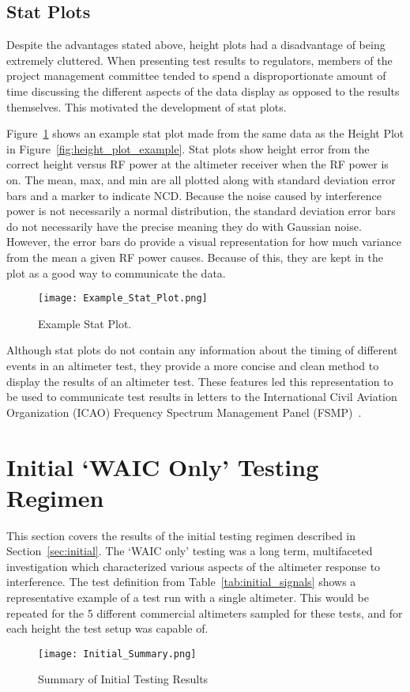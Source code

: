 \subsection{Stat Plots}
Despite the advantages stated above, height plots had a disadvantage of being extremely cluttered. When presenting test results to regulators, members of the project management committee tended to spend a disproportionate amount of time discussing the different aspects of the data display as opposed to the results themselves. This motivated the development of stat plots.

Figure~\ref{fig:stat_plot_example} shows an example stat plot made from the same data as the Height Plot in Figure~\ref{fig:height_plot_example}. Stat plots show height error from the correct height versus RF power at the altimeter receiver when the RF power is on. The mean, max, and min are all plotted along with standard deviation error bars and a marker to indicate NCD. Because the noise caused by interference power is not necessarily a normal distribution, the standard deviation error bars do not necessarily have the precise meaning they do with Gaussian noise. However, the error bars do provide a visual representation for how much variance from the mean a given RF power causes. Because of this, they are kept in the plot as a good way to communicate the data.  
\begin{figure}[h!]
	\centering
	\texttt{[image: Example\_Stat\_Plot.png]}
	\caption{Example Stat Plot.}
	\label{fig:stat_plot_example}
\end{figure}

 Although stat plots do not contain any information about the timing of different events in an altimeter test, they provide a more concise and clean method to display the results of an altimeter test. These features led this representation to be used to communicate test results in letters to the International Civil Aviation Organization (ICAO) Frequency Spectrum Management Panel (FSMP)~\cite{uwe_radio_2019}. 
 
 
\section{Initial `WAIC Only' Testing Regimen}\label{sec:initial_results}

This section covers the results of the initial testing regimen described in Section~\ref{sec:initial}. The `WAIC only' testing was a long term, multifaceted investigation which characterized various aspects of the altimeter response to interference. The test definition from Table~\ref{tab:initial_signals} shows a representative example of a test run with a single altimeter. This would be repeated for the 5 different commercial altimeters sampled for these tests, and for each height the test setup was capable of. 
\begin{figure}[h!]
	\centering
	\texttt{[image: Initial\_Summary.png]}
	\caption{Summary of Initial Testing Results}
	\label{fig:initial_summary}
\end{figure}

